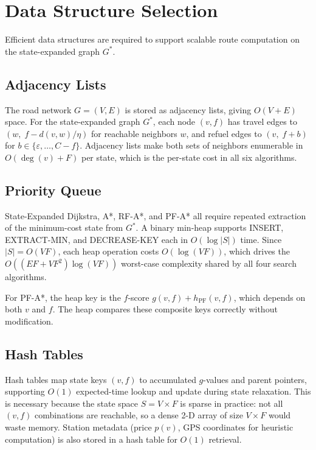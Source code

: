 \chapter{Data Structure Selection}

Efficient data structures are required to support scalable route computation on the
state-expanded graph $G^{*}$.

\section{Adjacency Lists}

The road network $G = (V, E)$ is stored as adjacency lists, giving $O(V + E)$ space.
For the state-expanded graph $G^{*}$, each node $(v, f)$ has travel edges to
$(w,\; f - d(v,w)/\eta)$ for reachable neighbors $w$, and refuel edges to $(v,\; f + b)$
for $b \in \{\varepsilon, \ldots, C - f\}$.
Adjacency lists make both sets of neighbors enumerable in $O(\deg(v) + F)$ per state,
which is the per-state cost in all six algorithms.

\section{Priority Queue}

State-Expanded Dijkstra, A*, RF-A*, and PF-A* all require repeated extraction of the
minimum-cost state from $G^{*}$.
A binary min-heap supports INSERT, EXTRACT-MIN, and DECREASE-KEY each in
$O(\log|S|)$ time.
Since $|S| = O(VF)$, each heap operation costs $O(\log(VF))$, which drives the
$O((EF + VF^{2})\log(VF))$ worst-case complexity shared by all four search algorithms.

For PF-A*, the heap key is the $f$-score $g(v,f) + h_{\mathrm{PF}}(v,f)$, which depends on
both $v$ and $f$.
The heap compares these composite keys correctly without modification.

\section{Hash Tables}

Hash tables map state keys $(v, f)$ to accumulated $g$-values and parent pointers,
supporting $O(1)$ expected-time lookup and update during state relaxation.
This is necessary because the state space $S = V \times F$ is sparse in practice: not all
$(v, f)$ combinations are reachable, so a dense 2-D array of size $V \times F$ would waste
memory.
Station metadata (price $p(v)$, GPS coordinates for heuristic computation) is also stored in
a hash table for $O(1)$ retrieval.

